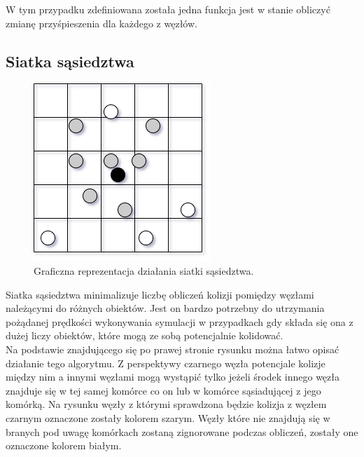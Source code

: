 \documentclass[12pt, letterpaper]{report}
\begin{document}
    
    W tym przypadku zdefiniowana została jedna funkcja jest w stanie obliczyć zmianę przyśpieszenia 
    dla każdego z węzłów.

    \subsection{Siatka sąsiedztwa}

    \begin{figure}
        \includegraphics[width=0.99\linewidth]{neib_grid.drawio}
        \caption{
            Graficzna reprezentacja działania siatki sąsiedztwa.
        }
    \end{figure}

    Siatka sąsiedztwa minimalizuje liczbę obliczeń kolizji pomiędzy węzłami 
    należącymi do różnych obiektów. Jest on bardzo potrzebny do utrzymania 
    pożądanej prędkości wykonywania symulacji w przypadkach gdy składa się ona 
    z dużej liczy obiektów, które mogą ze sobą potencjalnie kolidować. \\
    
    Na podstawie znajdującego się po prawej stronie rysunku można łatwo opisać
    działanie tego algorytmu. Z perspektywy czarnego węzła
    potencjale kolizje między nim a innymi węzłami mogą wystąpić tylko 
    jeżeli środek innego węzła znajduje się w tej 
    samej komórce co on lub w komórce sąsiadującej z jego komórką. Na rysunku 
    węzły z którymi sprawdzona będzie kolizja z węzłem czarnym oznaczone zostały
    kolorem szarym. Węzły które nie znajdują się w branych pod uwagę komórkach 
    zostaną zignorowane podczas obliczeń, zostały one oznaczone kolorem białym. \\
\end{document}
